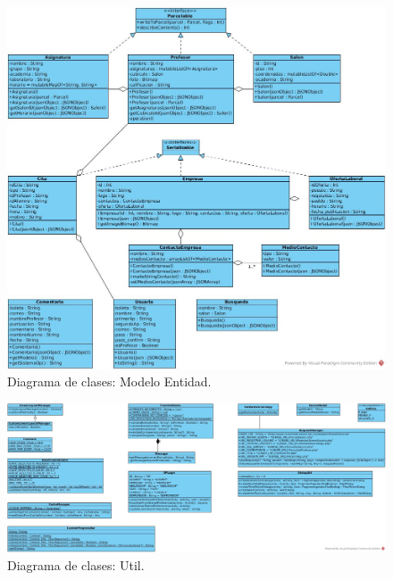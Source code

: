 \begin{figure}[!htpb]
	\hypertarget{fig:clasesModEntidad}{\hspace{1pt}}
	\begin{center}
		\includegraphics[width=1\textwidth]{images/clases/ModeloEntidad}
		\caption{Diagrama de clases: Modelo Entidad.}
		\label{fig:clasesModEntidad}
	\end{center}
\end{figure}

\begin{figure}[!htpb]
	\hypertarget{fig:clasesUtil}{\hspace{1pt}}
	\begin{center}
		\includegraphics[width=1\textwidth]{images/clases/Util}
		\caption{Diagrama de clases: Util.}
		\label{fig:clasesUtil}
	\end{center}
\end{figure}

